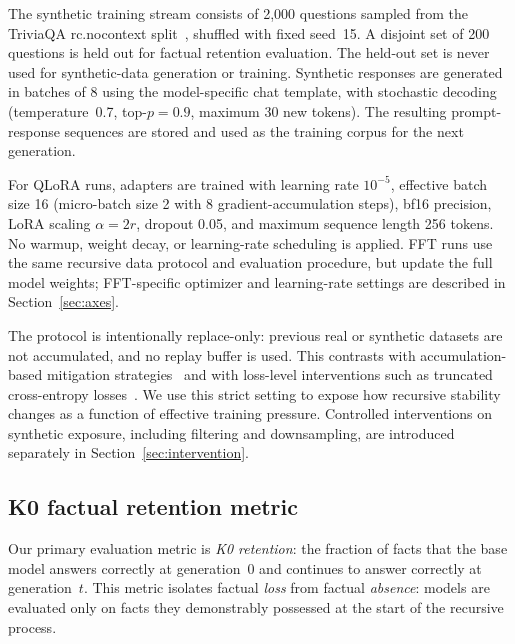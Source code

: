 \documentclass[a4paper,fleqn]{cas-dc}
\begin{document}
The synthetic training stream consists of 2{,}000
questions sampled from the TriviaQA rc.nocontext split~\citep{joshi2017},
shuffled with fixed seed~15. A disjoint set of 200 questions is held out for
factual retention evaluation. The held-out set is never used for synthetic-data
generation or training. Synthetic responses are generated in batches of 8 using
the model-specific chat template, with stochastic decoding
(temperature~0.7, top-$p=0.9$, maximum 30 new tokens). The resulting
prompt-response sequences are stored and used as the training corpus for the
next generation.

For QLoRA runs, adapters are trained with learning rate $10^{-5}$, effective
batch size 16 (micro-batch size 2 with 8 gradient-accumulation steps), bf16
precision, LoRA scaling $\alpha=2r$, dropout 0.05, and maximum sequence length
256 tokens. No warmup, weight decay, or learning-rate
scheduling is applied. FFT runs use the same recursive data protocol and
evaluation procedure, but update the full model weights; FFT-specific optimizer
and learning-rate settings are described in Section~\ref{sec:axes}.

The protocol is intentionally replace-only: previous real or synthetic datasets
are not accumulated, and no replay buffer is used. This contrasts with
accumulation-based mitigation strategies~\citep{gerstgrasser2024} and with
loss-level interventions such as truncated cross-entropy
losses~\citep{zibakhsh2024}. We use this strict setting to expose how recursive
stability changes as a function of effective training pressure. Controlled
interventions on synthetic exposure, including filtering and downsampling, are
introduced separately in Section~\ref{sec:intervention}.

\subsection{K0 factual retention metric}\label{sec:k0}

Our primary evaluation metric is \textit{K0 retention}: the fraction of
facts that the base model answers correctly at generation~0 and continues to
answer correctly at generation~$t$. This metric isolates factual
\textit{loss} from factual \textit{absence}: models are evaluated only on
facts they demonstrably possessed at the start of the recursive process.
\end{document}
